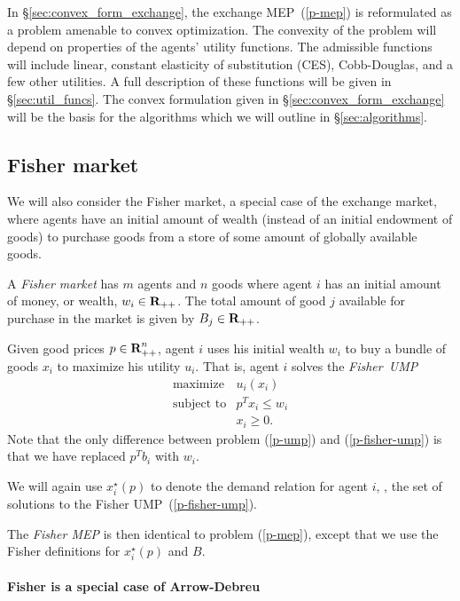 \documentclass[12pt]{article}
\begin{document}
In \S\ref{sec:convex_form_exchange}, the exchange MEP~(\ref{p-mep}) is
reformulated as a problem amenable to convex optimization. The convexity of the
problem will depend on properties of the agents' utility functions. The
admissible functions will include linear, constant elasticity of substitution
(CES), Cobb-Douglas, and a few other utilities. A full description of these
functions will be given in \S\ref{sec:util_funcs}. The convex formulation given
in \S\ref{sec:convex_form_exchange} will be the basis for the algorithms which
we will outline in \S\ref{sec:algorithms}.


\subsection{Fisher market}

We will also consider the Fisher market, a special case of the exchange market,
where agents have an initial amount of wealth (instead of an initial endowment
of goods) to purchase goods from a store of some amount of globally available
goods.

A \emph{Fisher market} has $m$ agents and $n$ goods where agent $i$ has an
initial amount of money, or wealth, $w_i \in {\mbox{\bf R}}_{++}$. The total amount of
good $j$ available for purchase in the market is given by $B_j \in
{\mbox{\bf R}}_{++}$.

Given good prices $p \in {\mbox{\bf R}}^n_{++}$, agent $i$ uses his initial wealth
$w_i$ to buy a bundle of goods $x_i$ to maximize his utility $u_i$. That is,
agent $i$ solves the \emph{Fisher~UMP}
\begin{equation}
\label{p-fisher-ump}
\begin{array}{ll}
\mbox{maximize} & u_i(x_i) \\
\mbox{subject to} & p^T x_i \leq w_i \\
& x_i \geq 0.
\end{array}
\end{equation}
Note that the only difference between problem (\ref{p-ump}) and
(\ref{p-fisher-ump}) is that we have replaced $p^T b_i$ with $w_i$.

We will again use $x^\star_i(p)$ to denote the demand relation for agent $i$,
\ie, the set of solutions to the Fisher UMP~(\ref{p-fisher-ump}).

The \emph{Fisher MEP} is then identical to problem (\ref{p-mep}), except that
we use  the Fisher definitions for $x^\star_i(p)$ and $B$.


\paragraph{Fisher is a special case of Arrow-Debreu}
\end{document}
